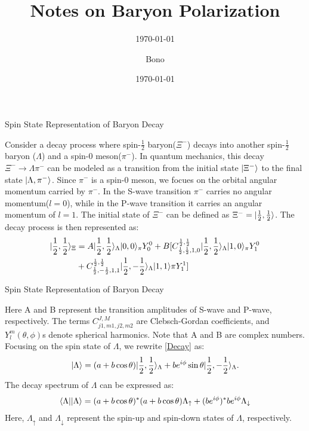 \documentclass[
	xcolor=dvipsnames,
	10pt, 
	]{beamer}
\title[]{Notes on Baryon Polarization}
\author[\frac{1}{2}uthor]{Bono}
\institute{Bono University}
\date{\today}
\subtitle{\today}
\begin{document}
\begin{frame}[t,plain] %
       \titlepage
\end{frame}
\begin{frame}{Spin State Representation of Baryon Decay}
	\begin{block}{}
		Consider a decay process where spin-$\frac{1}{2}$ baryon($\Xi^-$)  decays into another spin-$\frac{1}{2}$ baryon ($\Lambda$) and a spin-0 meson($\pi^-$). In quantum mechanics, this decay $\Xi^-\to \Lambda\pi^-$  can be modeled as a transition from the initial state $|\Xi^-\rangle$ to the final state $|\Lambda,\pi^-\rangle$. Since $\pi^-$ is a spin-0 meson, we focues on the orbital angular momentum carried by $\pi^-$. In the S-wave transition  $\pi^-$ carries no angular momentum($l=0$), while in the P-wave transition it carries an angular momentum of $l=1$.  The initial state of $\Xi^-$ can be defined as		$\Xi^-=|\frac{1}{2},\frac{1}{2}\rangle$. The decay process is then represented as:
		\begin{align}
			|\frac{1}{2},\frac{1}{2}\rangle_\Xi &= A |\frac{1}{2},\frac{1}{2}\rangle_\Lambda|0,0\rangle_\pi Y_0^0 +B[C_{\frac{1}{2},\frac{1}{2},1,0}^{\frac{1}{2},\frac{1}{2}}|\frac{1}{2},\frac{1}{2}\rangle_\Lambda|1,0\rangle_\pi Y_1^0\nonumber\\
			&+C_{\frac{1}{2},-\frac{1}{2},1,1}^{\frac{1}{2},\frac{1}{2}}|\frac{1}{2},-\frac{1}{2}\rangle_\Lambda|1,1\rangle\pi Y_1^1]\label{Decay}
		\end{align}
	\end{block}
\end{frame}
\begin{frame}{Spin State Representation of Baryon Decay}
	\begin{block}{}
	Here A and B represent the transition amplitudes of S-wave and P-wave, respectively. The terms $C_{j1,m1,j2,m2}^{J,M}$  are Clebsch-Gordan coefficients, and $Y_l^m(\theta,\phi)$s denote spherical harmonics. Note that A and B are complex numbers. Focusing on the spin state of $\Lambda$, we rewrite \eqref{Decay} as:
	\begin{align}
		|\Lambda\rangle = (a + b\cos\theta)|\frac{1}{2},\frac{1}{2}\rangle_\Lambda + be^{i\phi}\sin\theta |\frac{1}{2},-\frac{1}{2}\rangle_\Lambda.\label{State}
	\end{align}
	The decay spectrum of $\Lambda$ can be expressed as:
	\begin{align}
		\langle \Lambda||\Lambda\rangle = (a+b\cos\theta)^* (a+b\cos\theta)\Lambda_{\uparrow}+ (be^{i\phi})^*be^{i\phi}\Lambda_{\downarrow}\label{Lambda}
	\end{align}
	Here, $\Lambda_{\uparrow}$ and $\Lambda_{\downarrow}$ represent the spin-up and spin-down states of $\Lambda$, respectively.
\end{block}
\end{frame}
\end{document}
